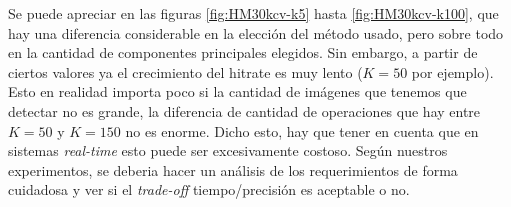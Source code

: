 Se puede apreciar en las figuras \ref{fig:HM30kcv-k5} hasta \ref{fig:HM30kcv-k100},
que hay una diferencia considerable en la elecci\'on del m\'etodo usado,
pero sobre todo en la cantidad de componentes principales elegidos. Sin embargo, a partir de ciertos valores
ya el crecimiento del hitrate es muy lento ($K=50$ por ejemplo). Esto en realidad importa poco
si la cantidad de im\'agenes que tenemos que detectar no es grande, la diferencia de cantidad
de operaciones que hay entre $K=50$ y $K=150$ no es enorme. Dicho esto, hay que tener en cuenta que
en sistemas \textit{real-time} esto puede ser excesivamente costoso. Seg\'un nuestros experimentos,
se deberia hacer un an\'alisis de los requerimientos de forma cuidadosa y ver si el \textit{trade-off} tiempo/precisi\'on
es aceptable o no.
